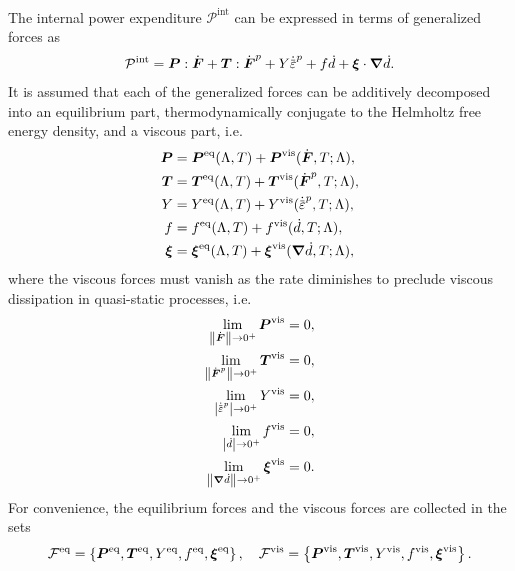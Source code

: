 The internal power expenditure $\mathcal{P}^\text{int}$ can be expressed in terms of generalized forces as
\begin{align}
  \mathcal{P}^\text{int} = \bfP:\dot{\bfF} + \bfT:\dot{\defgrad}^p + Y\epdot + f\dot{d} + \bs{\xi}\cdot\grad\dot{d}.
\end{align}
It is assumed that each of the generalized forces can be additively decomposed into an equilibrium part, thermodynamically conjugate to the Helmholtz free energy density, and a viscous part, i.e.
\begin{subequations}
  \begin{align}
    \bfP     & = \bfP^\text{eq}(\Lambda, T) + \bfP^\text{vis}(\dot{\defgrad}, T; \Lambda),       \\
    \bfT     & = \bfT^\text{eq}(\Lambda, T) + \bfT^\text{vis}(\dot{\defgrad}^p, T; \Lambda),     \\
    Y        & = Y^\text{eq}(\Lambda, T) + Y^\text{vis}(\epdot, T; \Lambda),                     \\
    f        & = f^\text{eq}(\Lambda, T) + f^\text{vis}(\dot{d}, T; \Lambda),                    \\
    \bs{\xi} & = \bs{\xi}^\text{eq}(\Lambda, T) + \bs{\xi}^\text{vis}(\grad\dot{d}, T; \Lambda), 
  \end{align}
\end{subequations}
where the viscous forces must vanish as the rate diminishes to preclude viscous dissipation in quasi-static processes, i.e.
\begin{subequations}
  \begin{align}
    \lim_{\norm{\dot{\defgrad}} \to 0^+}\bfP^\text{vis}   & = 0, \\
    \lim_{\norm{\dot{\defgrad}^p} \to 0^+}\bfT^\text{vis} & = 0, \\
    \lim_{\abs{\epdot} \to 0^+}Y^\text{vis}               & = 0, \\
    \lim_{\abs{\dot{d}} \to 0^+}f^\text{vis}              & = 0, \\
    \lim_{\norm{\grad\dot{d}} \to 0^+}\bs{\xi}^\text{vis} & = 0. 
  \end{align}
\end{subequations}
For convenience, the equilibrium forces and the viscous forces are collected in the sets
\begin{align}
  \mathcal{F}^\text{eq} = \left\{ \boldsymbol{P}^\text{eq}, \boldsymbol{T}^\text{eq}, Y^\text{eq}, f^\text{eq}, \boldsymbol{\xi}^\text{eq} \right\}, \quad \mathcal{F}^\text{vis} = \left\{ \boldsymbol{P}^\text{vis}, \boldsymbol{T}^\text{vis}, Y^\text{vis}, f^\text{vis}, \boldsymbol{\xi}^\text{vis} \right\}.
\end{align}

